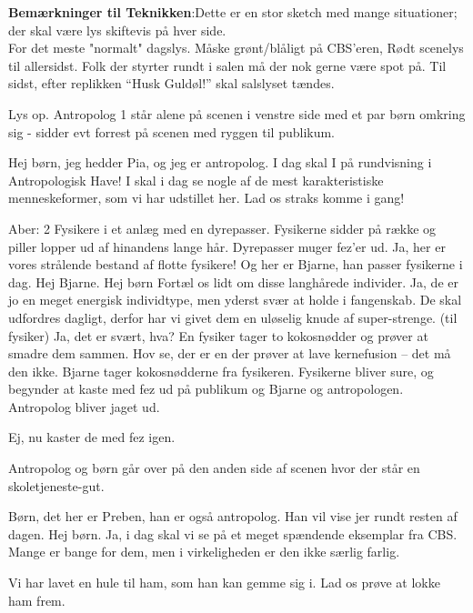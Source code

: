 \documentclass[a4paper,12pt]{article}
\begin{document}
\begin{sketch}

\textbf{Bemærkninger til Teknikken}:Dette er en stor sketch med mange situationer; der skal være lys skiftevis på hver side.\\ For det meste "normalt" dagslys. Måske grønt/blåligt på CBS'eren, Rødt scenelys til allersidst. Folk der styrter rundt i salen må der nok gerne være spot på.
Til sidst, efter replikken ``Husk Guldøl!'' skal salslyset tændes.


\scene Lys op. Antropolog 1 står alene på scenen i venstre side med et par børn omkring sig - sidder evt forrest på scenen med ryggen til publikum.

 Hej børn, jeg hedder Pia, og jeg er antropolog. I dag skal I på rundvisning i Antropologisk Have! I skal i dag se nogle af de mest karakteristiske menneskeformer, som vi har udstillet her. Lad os straks komme i gang!


\scene Aber: 2 Fysikere i et anlæg med en dyrepasser. Fysikerne sidder på række og piller lopper ud af hinandens lange hår. Dyrepasser muger fez'er ud.
 Ja, her er vores strålende bestand af flotte fysikere! Og her er Bjarne, han passer fysikerne i dag. Hej Bjarne.
 Hej børn
Fortæl os lidt om disse langhårede individer.
Ja, de er jo en meget energisk individtype, men yderst svær at holde i fangenskab. De skal udfordres dagligt, derfor har vi givet dem en uløselig knude af super-strenge. (til fysiker) Ja, det er svært, hva?
\scene En fysiker tager to kokosnødder og prøver at smadre dem sammen.
Hov se, der er en der prøver at lave kernefusion -- det må den ikke.
\scene Bjarne tager kokosnødderne fra fysikeren. Fysikerne bliver sure, og begynder at kaste med fez ud på publikum og Bjarne og antropologen. Antropolog bliver jaget ud.

Ej, nu kaster de med fez igen.

\scene Antropolog og børn går over på den anden side af scenen hvor der står en skoletjeneste-gut.

Børn, det her er Preben, han er også antropolog. Han vil vise jer rundt resten af dagen.
Hej børn. Ja, i dag skal vi se på et meget spændende eksemplar fra CBS. Mange er bange for dem, men i virkeligheden er den ikke særlig farlig.

Vi har lavet en hule til ham, som han kan gemme sig i. Lad os prøve at lokke ham frem.


\end{sketch}
\end{document}

